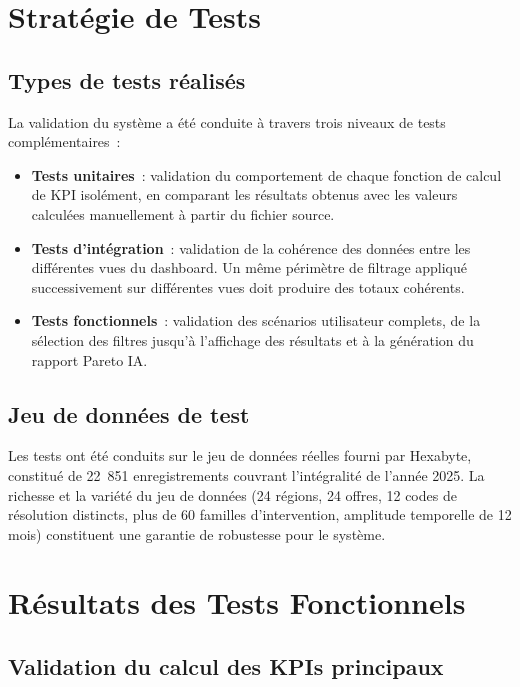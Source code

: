 \documentclass[11pt,a4paper]{report}
\begin{document}
\section{Stratégie de Tests}

\subsection{Types de tests réalisés}

La validation du système a été conduite à travers trois niveaux de tests complémentaires~:

\begin{itemize}
  \item \textbf{Tests unitaires}~: validation du comportement de chaque fonction de calcul de KPI isolément, en comparant les résultats obtenus avec les valeurs calculées manuellement à partir du fichier source.
  \item \textbf{Tests d'intégration}~: validation de la cohérence des données entre les différentes vues du dashboard. Un même périmètre de filtrage appliqué successivement sur différentes vues doit produire des totaux cohérents.
  \item \textbf{Tests fonctionnels}~: validation des scénarios utilisateur complets, de la sélection des filtres jusqu'à l'affichage des résultats et à la génération du rapport Pareto IA.
\end{itemize}

\subsection{Jeu de données de test}

Les tests ont été conduits sur le jeu de données réelles fourni par Hexabyte, constitué de 22~851 enregistrements couvrant l'intégralité de l'année 2025. La richesse et la variété du jeu de données (24 régions, 24 offres, 12 codes de résolution distincts, plus de 60 familles d'intervention, amplitude temporelle de 12 mois) constituent une garantie de robustesse pour le système.

\section{Résultats des Tests Fonctionnels}

\subsection{Validation du calcul des KPIs principaux}
\end{document}
